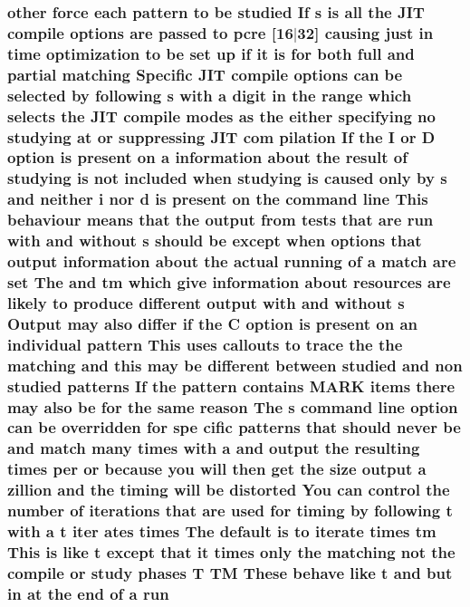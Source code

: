 \subsubsection[{\texorpdfstring{run}{run}}]{ other force each {\bf pattern} {\bf to} {\bf be} {\bf studied} If {\bf s} {\bf is} {\bf all} the J\+IT {\bf compile} {\bf options} {\bf are} passed {\bf to} {\bf pcre} \mbox{[}16$\vert$32\mbox{]} causing just {\bf in} {\bf time} optimization {\bf to} {\bf be} {\bf set} up {\bf if} {\bf it} {\bf is} for both full and {\bf partial} {\bf matching} Specific J\+IT {\bf compile} {\bf options} {\bf can} {\bf be} {\bf selected} by following {\bf s} {\bf with} {\bf a} digit {\bf in} the range {\bf which} selects the J\+IT {\bf compile} {\bf modes} {\bf as} the either {\bf specifying} no {\bf studying} at {\bf or} suppressing J\+IT com pilation If the {\bf I} {\bf or} {\bf D} {\bf option} {\bf is} {\bf present} {\bf on} {\bf a} information about the {\bf result} {\bf of} {\bf studying} {\bf is} {\bf not} {\bf included} when {\bf studying} {\bf is} caused only by {\bf s} and neither {\bf i} nor {\bf d} {\bf is} {\bf present} {\bf on} the {\bf command} {\bf line} This behaviour means that the {\bf output} {\bf from} {\bf tests} that {\bf are} run {\bf with} and without {\bf s} should {\bf be} {\bf except} when {\bf options} that {\bf output} information about the actual running {\bf of} {\bf a} {\bf match} {\bf are} {\bf set} The and {\bf tm} {\bf which} give information about resources {\bf are} likely {\bf to} produce different {\bf output} {\bf with} and without {\bf s} Output may also differ {\bf if} the {\bf C} {\bf option} {\bf is} {\bf present} {\bf on} an individual {\bf pattern} This uses callouts {\bf to} trace the the {\bf matching} and {\bf this} may {\bf be} different between {\bf studied} and non {\bf studied} {\bf patterns} If the {\bf pattern} {\bf contains} M\+A\+RK items there may also {\bf be} for the same {\bf reason} The {\bf s} {\bf command} {\bf line} {\bf option} {\bf can} {\bf be} overridden for spe cific {\bf patterns} that should never {\bf be} and {\bf match} many {\bf times} {\bf with} {\bf a} and {\bf output} the resulting {\bf times} per {\bf or} because you will then get the {\bf size} {\bf output} {\bf a} zillion and the timing will {\bf be} distorted You {\bf can} control the {\bf number} {\bf of} iterations that {\bf are} {\bf used} for timing by following {\bf t} {\bf with} {\bf a} {\bf t} {\bf iter} ates {\bf times} The {\bf default} {\bf is} {\bf to} iterate {\bf times} {\bf tm} This {\bf is} like {\bf t} {\bf except} that {\bf it} {\bf times} only the {\bf matching} {\bf not} the {\bf compile} {\bf or} {\bf study} phases {\bf T} TM These behave like {\bf t} and but {\bf in} at the {\bf end} {\bf of} {\bf a} run}\hypertarget{pcretest_8txt_a5a989107465910839d799cefcea80d85}{}\label{pcretest_8txt_a5a989107465910839d799cefcea80d85}
